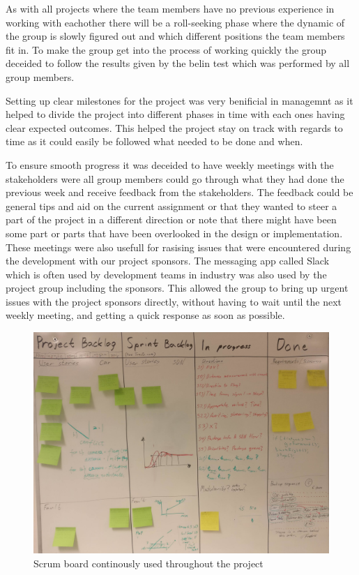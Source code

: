 \documentclass[11pt, titlepage]{article} %
\begin{document}
As with all projects where the team members have no previous experience in working with eachother there will be a roll-seeking phase where the dynamic of the group is slowly figured out and which different positions the team members fit in. To make the group get into the process of working quickly the group deceided to follow the results given by the belin test which was performed by all group members.

Setting up clear milestones for the project was very benificial in managemnt as it helped to divide the project into different phases in time with each ones having clear expected outcomes. This helped the project stay on track with regards to time as it could easily be followed what needed to be done and when.

To ensure smooth progress it was deceided to have weekly meetings with the stakeholders were all group members could go through what they had done the previous week and receive feedback from the stakeholders. The feedback could be general tips and aid on the current assignment or that they wanted to steer a part of the project in a different direction or note that there might have been some part or parts that have been overlooked in the design or implementation. These meetings were also usefull for rasising issues that were encountered during the development with our project sponsors. The messaging app called Slack which is often used by development teams in industry was also used by the project group including the sponsors. This allowed the group to bring up urgent issues with the project sponsors directly, without having to wait until the next weekly meeting, and getting a quick response as soon as possible.


\begin{figure}[]
	\centering
   	\includegraphics[scale=0.5]{scrum-board.jpg}
   	\caption{Scrum board continously used throughout the project}
    \label{fig:scrum-board}
\end{figure}
\end{document}
